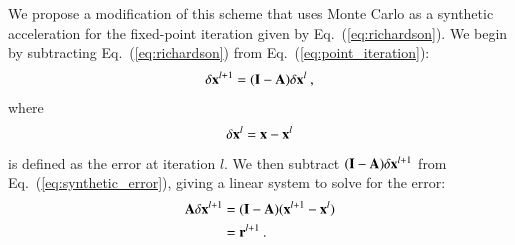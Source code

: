 \documentclass[preprint,12pt]{elsarticle}
\newcommand{\vA}{\ensuremath{\ve{A}}}
\newcommand{\vx}{\ensuremath{\ve{x}}}
\newcommand{\vr}{\ensuremath{\ve{r}}}
\newcommand{\vI}{\ensuremath{\ve{I}}}
\begin{document}
We propose a modification of this scheme that uses Monte Carlo as a
synthetic acceleration for the fixed-point iteration given by
Eq.~(\ref{eq:richardson}). We begin by subtracting Eq.~(\ref{eq:richardson})
from Eq.~(\ref{eq:point_iteration}):
\begin{equation}
  \delta \vx^{l+1} = (\vI - \vA)\delta \vx^{l}\:,
  \label{eq:synthetic_error}
\end{equation}
where
\begin{equation}
  \delta \vx^{l} = \vx - \vx^{l}
\end{equation}
is defined as the error at iteration $l$. We then subtract $(\vI-\vA)
\delta \vx^{l+1}$ from Eq.~(\ref{eq:synthetic_error}), giving a linear
system to solve for the error:
\begin{equation}
  \begin{split}
    \vA \delta \vx^{l+1} &= (\vI - \vA)(\vx^{l+1} - \vx^{l}) \\ &=
    \vr^{l+1}\:.
  \end{split}
  \label{eq:synthetic_error2}
\end{equation}
\end{document}
